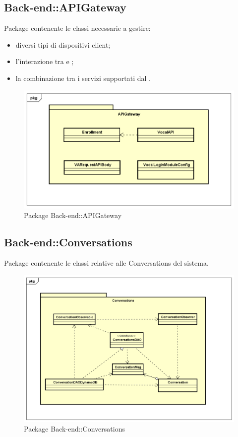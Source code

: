 \subsection{Back-end::APIGateway}
Package contenente le classi necessarie a gestire: \begin{itemize} \item diversi tipi di dispositivi client; \item l'interazione tra  e ; \item la combinazione tra i servizi supportati dal . \end{itemize}
\begin{figure}[h] \centering \includegraphics[width=\textwidth,height=\textheight,keepaspectratio]{images/diagrams/back-end/Official_Backend_0304/APIGateway.png}
\caption{Package Back-end::APIGateway}
\end{figure}
\newpage



\subsection{Back-end::Conversations}
Package contenente le classi relative alle Conversations del sistema.
\begin{figure}[h] \centering \includegraphics[width=\textwidth,height=\textheight,keepaspectratio]{images/diagrams/back-end/Official_Backend_0304/Conversations.png}
\caption{Package Back-end::Conversations}
\end{figure}
\newpage

